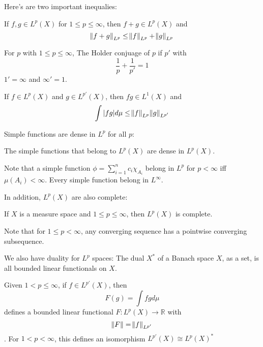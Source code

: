 \documentclass[main.tex]{subfiles}
\begin{document}
Here's are two important inequalies:

\begin{theorem}
If $f, g \in L^p(X)$ for $1 \leq p \leq \infty$, then $f + g \in L^p(X)$ and 
$$
\norm{f + g}_{L^p} \leq \norm{f}_{L^p} + \norm{g}_{L^p}
$$
\end{theorem}

\begin{definition}
For $p$ with $1 \leq p \leq \infty$, 
The Holder conjuage of $p$ if $p'$ with 
$$
\frac{1}{p} + \frac{1}{p'} = 1
$$
$1' = \infty$ and $\infty' = 1$.
\end{definition}

\begin{theorem}
If $f \in L^p(X)$ and $g \in L^{p'}(X)$, then $fg \in L^1(X)$ and 
$$
\int |fg| d\mu \leq \norm{f}_{L^p}\norm{g}_{L^{p'}}
$$
\end{theorem}

Simple functions are dense in $L^p$ for all $p$:

\begin{theorem}
The simple functions that belong to $L^p(X)$ are dense in $L^p(X)$.
\end{theorem}

Note that a simple function $\phi = \sum_{i=1} ^n c_i \chi_{A_i}$ belong in $L^p$ for $p < \infty$ iff $\mu(A_i) < \infty$. Every simple function belong in $L^\infty$.

In addition, $L^p(X)$ are also complete:

\begin{theorem}
If $X$ is a measure space and $1 \leq p \leq \infty$, then $L^p(X)$ is complete.
\end{theorem}

Note that for $1 \leq p < \infty$, any converging sequence has a pointwise converging subsequence.

We also have duality for $L^p$ spaces:
The dual $X^*$ of a Banach space $X$, as a set, is all bounded linear functionals on $X$.

\begin{theorem}
Given $1 < p \leq \infty$, if $f \in L^{p'}(X)$, then 
$$
F(g) = \int fg d\mu 
$$
defines a bounded linear functional $F: L^p(X) \rightarrow \mathbb{R}$ with 
$$
\norm{F} = \norm{f}_{L^{p'}}
$$.
For $1 < p < \infty$, this defines an isomorphism $L^{p'}(X) \cong L^p(X)^*$
\end{theorem}
\end{document}
